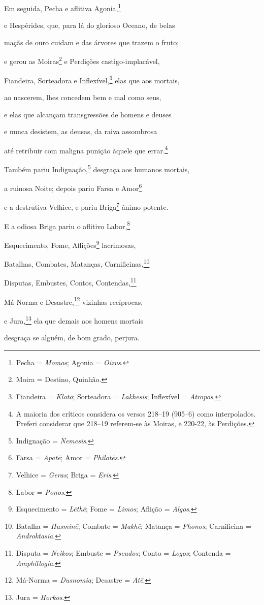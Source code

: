 \begin{pages}
\begin{Rightside}
Em seguida, Pecha e aflitiva Agonia,\footnote{Pecha = \emph{Momos}; Agonia = \emph{Oizus}.}

e Hespérides, que, para lá do glorioso Oceano, de belas 

maçãs de ouro cuidam e das árvores que trazem o fruto;

e gerou as Moiras\footnote{Moira = Destino, Quinhão.} e Perdições castigo-implacável,

Fiandeira, Sorteadora e Inflexível,\footnote{Fiandeira = \emph{Klotō}; Sorteadora = \emph{Lakhesis}; Inflexível = \emph{Atropos}.} elas que aos mortais,

ao nascerem, lhes concedem bem e mal como seus,

e elas que alcançam transgressões de homens e deuses 

e nunca desistem, as deusas, da raiva assombrosa

até retribuir com maligna punição àquele que errar.\footnote{A maioria dos críticos considera os versos 218--19
(905--6) como interpolados. Preferi considerar que
218--19 referem-se às Moiras, e 220-22, às Perdições.}

Também pariu Indignação,\footnote{Indignação = \emph{Nemesis}.} desgraça aos humanos mortais,

a ruinosa Noite; depois pariu Farsa e Amor\footnote{Farsa = \emph{Apatē}; Amor
= \emph{Philotēs}.}

e a destrutiva Velhice, e pariu Briga\footnote{Velhice = \emph{Geras}; Briga = \emph{Eris}.} ânimo-potente. 

\quad{}E a odiosa Briga pariu o aflitivo Labor,\footnote{Labor = \emph{Ponos}.}

Esquecimento, Fome, Aflições\footnote{Esquecimento = \emph{Lēthē}; Fome =
\emph{Limos}; Aflição = \emph{Algos}.} lacrimosas,

Batalhas, Combates, Matanças, Carnificinas,\footnote{Batalha = \emph{Husminē}; Combate
= \emph{Makhē}; Matança = \emph{Phonos}; Carnificina = \emph{Androktasia}.}

Disputas, Embustes, Contos, Contendas,\footnote{Disputa = \emph{Neikos}; Embuste = \emph{Pseudos}; Conto = \emph{Logos}; Contenda = \emph{Amphillogia}.}

Má-Norma e Desastre,\footnote{Má-Norma =
\emph{Dusnomia}; Desastre = \emph{Atē}.} vizinhas recíprocas, 

e Jura,\footnote{Jura = \emph{Horkos}.} ela que demais aos homens mortais

desgraça se alguém, de bom grado, perjura.


\end{Rightside}
\end{pages}
